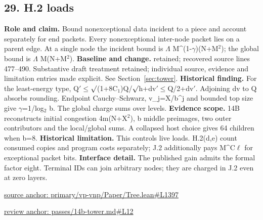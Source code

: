 \documentclass[11pt,letterpaper]{article}
\theoremstyle{definition}\newtheorem{definition}[theorem]{Definition}\newtheorem{example}[theorem]{Example}
\theoremstyle{remark}\newtheorem{remark}[theorem]{Remark}
\begin{document}
\subsection*{29. H.2 loads}
\textbf{Role and claim.} Bound nonexceptional data incident to a piece and account separately for end packets. Every nonexceptional inter-node packet lies on a parent edge. At a single node the incident bound is \ensuremath{\Lambda} M\textasciicircum{}(1-\ensuremath{\gamma})(N+M\ensuremath{{}^2}); the global bound is \ensuremath{\Lambda} M(N+M\ensuremath{{}^2}).
\textbf{Baseline and change.} retained; recovered source lines 477--490. Substantive draft treatment retained; individual source, evidence and limitation entries made explicit. See Section~\ref{sec:tower}.
\textbf{Historical finding.} For the least-energy type, Q\ensuremath{\prime}\ensuremath{\le}\ensuremath{\sqrt{\vphantom{x}}}(1+8C\ensuremath{{}_1})Q/\ensuremath{\sqrt{\vphantom{x}}}h+dv\ensuremath{\prime}\ensuremath{\le}Q/2+dv\ensuremath{\prime}. Adjoining dv to Q absorbs rounding. Endpoint Cauchy–Schwarz, v\_j=X/b\textasciicircum{}j and bounded top size give \ensuremath{\gamma}=1/log\ensuremath{{}_2} b. The global charge sums over levels.
\textbf{Evidence scope.} 14B reconstructs initial congestion 4m(N+X\ensuremath{{}^2}), b middle preimages, two outer contributors and the local/global sums. A collapsed host choice gives 64 children when b=8.
\textbf{Historical limitation.} This controls live loads. H.2(d,e) count consumed copies and program costs separately; J.2 additionally pays M\textasciicircum{}C\ensuremath{\ell} for exceptional packet bits.
\textbf{Interface detail.} The published gain admits the formal factor eight. Terminal IDs can join arbitrary nodes; they are charged in J.2 even at zero layers.
\par\href{https://github.com/nousentllc/VP-VNP-Review/blob/8a7976933b6b2b4ffda1ad3a0dfb5fc6b6f023e8/primary/vp-vnp/Paper/Tree.lean\#L1397}{source anchor: primary/vp-vnp/Paper/Tree.lean\#L1397}
\par\href{https://github.com/nousentllc/VP-VNP-Review/blob/8a7976933b6b2b4ffda1ad3a0dfb5fc6b6f023e8/passes/14b-tower.md\#L12}{review anchor: passes/14b-tower.md\#L12}
\goodbreak
\end{document}
